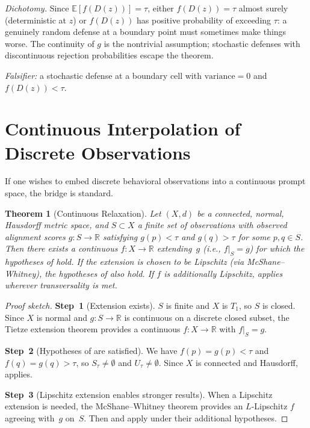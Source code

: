 \documentclass[11pt]{article}
\newtheorem{theorem}{Theorem}[section]
\newcommand{\R}{\mathbb{R}}
\begin{document}
\emph{Dichotomy.} Since $\mathbb{E}[f(D(z))] = \tau$, either
$f(D(z)) = \tau$ almost surely (deterministic at $z$) or $f(D(z))$ has
positive probability of exceeding $\tau$: a genuinely random defense
at a boundary point must sometimes make things worse. The continuity
of $g$ is the nontrivial assumption; stochastic defenses with
discontinuous rejection probabilities escape the theorem.

\emph{Falsifier:} a stochastic defense at a boundary cell with
$\mathrm{variance}=0$ and $f(D(z)) < \tau$.

\section{Continuous Interpolation of Discrete Observations}
\label{app:continuous-relaxation}

If one wishes to embed discrete behavioral observations into a
continuous prompt space, the bridge is standard.

\begin{theorem}[Continuous Relaxation]
\label{thm:tietze}
Let $(X,d)$ be a connected, normal, Hausdorff metric space, and
$S \subset X$ a finite set of observations with observed alignment
scores $g\colon S \to \R$ satisfying $g(p) < \tau$ and $g(q) > \tau$
for some $p, q \in S$. Then there exists a continuous $f\colon X \to \R$
extending~$g$ (i.e., $f|_S = g$) for which the hypotheses of
 hold. If the extension is chosen to be Lipschitz
(via McShane--Whitney), the hypotheses of  also
hold. If $f$ is additionally Lipschitz,  applies
wherever transversality is met.
\end{theorem}

\begin{proof}[Proof sketch]
\textbf{Step~1} (Extension exists).
$S$ is finite and $X$ is $T_1$, so $S$ is closed. Since $X$ is normal
and $g\colon S \to \R$ is continuous on a discrete closed subset, the
Tietze extension theorem provides a continuous
$f\colon X \to \R$ with $f|_S = g$.

\textbf{Step~2} (Hypotheses of  are satisfied).
We have $f(p) = g(p) < \tau$ and $f(q) = g(q) > \tau$, so
$S_\tau \neq \emptyset$ and $U_\tau \neq \emptyset$. Since $X$ is
connected and Hausdorff,  applies.

\textbf{Step~3} (Lipschitz extension enables stronger results).
When a Lipschitz extension is needed, the McShane--Whitney theorem
provides an $L$-Lipschitz $f$ agreeing with~$g$ on~$S$. Then
 and  apply under their
additional hypotheses.
\end{proof}
\end{document}
